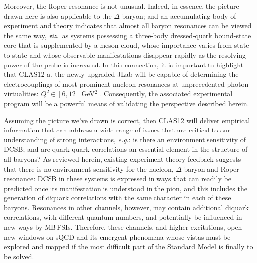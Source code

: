 Moreover, the Roper resonance is not unusual.  Indeed, in essence, the picture drawn here is also applicable to the $\Delta$-baryon; and an accumulating body of experiment and theory indicates that almost all baryon resonances can be viewed the same way, \emph{viz}.\ as systems possessing a three-body dressed-quark bound-state core that is supplemented by a meson cloud, whose importance varies from state to state and whose observable manifestations disappear rapidly as the resolving power of the probe is increased.  In this connection, it is important to highlight that CLAS12 at the newly upgraded JLab will be capable of determining the electrocouplings of most prominent nucleon resonances at unprecedented photon virtualities: $Q^2\in [6,12]\,$GeV$^2$ \cite{E12-09-003, E12-06-108A}.  Consequently, the associated experimental program will be a powerful means of validating the perspective described herein.

Assuming the picture we've drawn is correct, then CLAS12 will deliver empirical information that can address a wide range of issues that are critical to our understanding of strong interactions, \emph{e.g}.: is there an environment sensitivity of DCSB; and are quark-quark correlations an essential element in the structure of all baryons?  As reviewed herein, existing experiment-theory feedback suggests that there is no environment sensitivity for the nucleon, $\Delta$-baryon and Roper resonance: DCSB in these systems is expressed in ways that can readily be predicted once its manifestation is understood in the pion, and this includes the generation of diquark correlations with the same character in each of these baryons.
%
Resonances in other channels, however, may contain additional diquark correlations, with different quantum numbers, and potentially be influenced in new ways by MB\,FSIs.  Therefore, these channels, and higher excitations, open new windows on sQCD and its emergent phenomena whose vistas must be explored and mapped if the most difficult part of the Standard Model is finally to be solved. 
